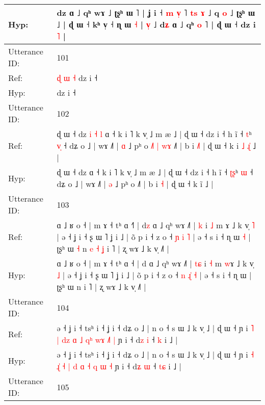 \documentclass[10pt]{article}
\DeclareRobustCommand{\hl}[1]{{\textcolor{red}{#1}}}
\begin{document}
\begin{longtable}{ll}
 \\
Hyp: & dz ɑ ˩ qʰ wɤ ˩ ʈʂʰ ɯ ˥ | ʝ i ˧ \hl{m} \hl{v}\hl{̩} ˥ \hl{t}\hl{s} \hl{ɤ} ˩ q\hl{} \hl{}\hl{o} ˩ ʈʂʰ ɯ ˩ | ɖ ɯ ˧ kʰ v̩ ˧ ɳ ɯ \hl{˧} | \hl{}\hl{v}\hl{̩} ˩ d\hl{ʑ} ɑ ˩ qʰ \hl{}\hl{o} ˥ | ɖ ɯ ˧ dz i \hl{˥} |
 \\
\midrule
Utterance ID: & 101 \\
Ref: & \hl{ɖ}\hl{ }\hl{ɯ}\hl{ }\hl{˧}\hl{ }dz i ˧
 \\
Hyp: & \hl{}\hl{}\hl{}\hl{}\hl{}\hl{}dz i ˧
 \\
\midrule
Utterance ID: & 102 \\
Ref: & ɖ ɯ ˧ dz\hl{ }\hl{i}\hl{ }\hl{˧}\hl{ }\hl{l} ɑ ˧ k i ˥ k v̩ ˩ m æ ˩ | ɖ ɯ ˧ dz i ˧ h ĩ ˧ \hl{}\hl{t}ʰ \hl{v}\hl{̩} ˧ dʑ o ˩ | wɤ ˩˥ | \hl{ɑ} ˩ pʰ o\hl{ }\hl{˩}\hl{˥}\hl{ }\hl{|}\hl{ }\hl{w}\hl{ɤ} ˩˥ | b i \hl{˩}\hl{˥} | ɖ ɯ ˧ k i\hl{ }\hl{˩}\hl{ }\hl{ɻ}\hl{̍} ˩ |
 \\
Hyp: & ɖ ɯ ˧ dz\hl{}\hl{}\hl{}\hl{}\hl{}\hl{} ɑ ˧ k i ˥ k v̩ ˩ m æ ˩ | ɖ ɯ ˧ dz i ˧ h ĩ ˧ \hl{ʈ}\hl{ʂ}ʰ \hl{}\hl{ɯ} ˧ dʑ o ˩ | wɤ ˩˥ | \hl{ə} ˩ pʰ o\hl{}\hl{}\hl{}\hl{}\hl{}\hl{}\hl{}\hl{} ˩˥ | b i \hl{}\hl{˧} | ɖ ɯ ˧ k i\hl{}\hl{}\hl{}\hl{}\hl{̃} ˩ |
 \\
\midrule
Utterance ID: & 103 \\
Ref: & ɑ ˩ ʁ o ˧ | m ɤ ˧ tʰ ɑ ˧\hl{˥} | d\hl{z} ɑ ˩ qʰ wɤ ˩˥ | \hl{}\hl{k} i \hl{˩} m \hl{}ɤ ˩ k v̩ \hl{˥} | ə ˧ ʝ i ˧ ʂ ɯ ˥ ʝ i ˩ | õ p i ˧ z o ˧ \hl{ɲ} \hl{}\hl{i} \hl{˥} | ə ˧ s i ˧ ɳ ɯ\hl{ }\hl{˧} | ʈʂʰ ɯ\hl{ }\hl{˧} n\hl{ }\hl{e}\hl{ }\hl{˧}\hl{ }\hl{ʝ} i ˥ | ʐ wɤ ˩ k v̩ ˩˥ |
 \\
Hyp: & ɑ ˩ ʁ o ˧ | m ɤ ˧ tʰ ɑ ˧\hl{} | d\hl{} ɑ ˩ qʰ wɤ ˩˥ | \hl{t}\hl{ɕ} i \hl{˧} m \hl{w}ɤ ˩ k v̩ \hl{˩} | ə ˧ ʝ i ˧ ʂ ɯ ˥ ʝ i ˩ | õ p i ˧ z o ˧ \hl{n} \hl{ɻ}\hl{̍} \hl{˧} | ə ˧ s i ˧ ɳ ɯ\hl{}\hl{} | ʈʂʰ ɯ\hl{}\hl{} n\hl{}\hl{}\hl{}\hl{}\hl{}\hl{} i ˥ | ʐ wɤ ˩ k v̩ ˩˥ |
 \\
\midrule
Utterance ID: & 104 \\
Ref: & ə ˧ ʝ i ˧ tsʰ i ˧ ʝ i ˧ dʑ o ˩ | n o ˧ s ɯ ˩ k v̩ ˩ | ɖ ɯ ˧ ɲ i \hl{˥} \hl{|}\hl{ }\hl{d}\hl{z} \hl{ɑ} \hl{˩} \hl{q}\hl{ʰ} \hl{w}\hl{ɤ}\hl{ }\hl{˩}\hl{˥} \hl{|} ɲ i ˧ d\hl{z} \hl{i} ˧ \hl{}\hl{k} i ˩ |
 \\
Hyp: & ə ˧ ʝ i ˧ tsʰ i ˧ ʝ i ˧ dʑ o ˩ | n o ˧ s ɯ ˩ k v̩ ˩ | ɖ ɯ ˧ ɲ i \hl{˧} \hl{ɻ}\hl{̍}\hl{ }\hl{˧} \hl{|} \hl{d} \hl{}\hl{ɑ} \hl{˧}\hl{ }\hl{q}\hl{ }\hl{ɯ} \hl{˧} ɲ i ˧ d\hl{ʑ} \hl{ɯ} ˧ \hl{t}\hl{ɕ} i ˩ |
 \\
\midrule
Utterance ID: & 105 \\

\end{longtable}
\end{document}
